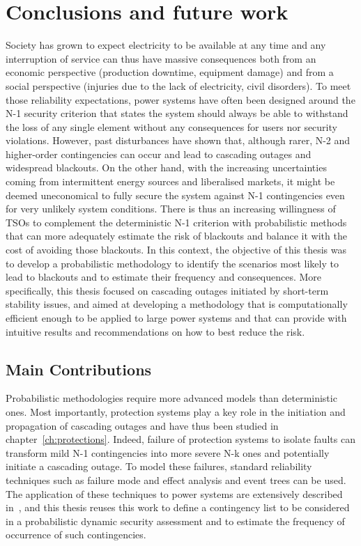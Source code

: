 
\chapter{Conclusions and future work}
\label{ch:perspectives}

Society has grown to expect electricity to be available at any time and any interruption of service can thus have massive consequences both from an economic perspective (production downtime, equipment damage) and from a social perspective (injuries due to the lack of electricity, civil disorders). To meet those reliability expectations, power systems have often been designed around the N-1 security criterion that states the system should always be able to withstand the loss of any single element without any consequences for users nor security violations. However, past disturbances have shown that, although rarer, N-2 and higher-order contingencies can occur and lead to cascading outages and widespread blackouts. On the other hand, with the increasing uncertainties coming from intermittent energy sources and liberalised markets, it might be deemed uneconomical to fully secure the system against N-1 contingencies even for very unlikely system conditions. There is thus an increasing willingness of TSOs to complement the deterministic N-1 criterion with probabilistic methods that can more adequately estimate the risk of blackouts and balance it with the cost of avoiding those blackouts. In this context, the objective of this thesis was to develop a probabilistic methodology to identify the scenarios most likely to lead to blackouts and to estimate their frequency and consequences. More specifically, this thesis focused on cascading outages initiated by short-term stability issues, and aimed at developing a methodology that is computationally efficient enough to be applied to large power systems and that can provide with intuitive results and recommendations on how to best reduce the risk.

\section{Main Contributions}

Probabilistic methodologies require more advanced models than deterministic ones. Most importantly, protection systems play a key role in the initiation and propagation of cascading outages and have thus been studied in chapter~\ref{ch:protections}. Indeed, failure of protection systems to isolate faults can transform mild N-1 contingencies into more severe N-k ones and potentially initiate a cascading outage. To model these failures, standard reliability techniques such as failure mode and effect analysis and event trees can be used. The application of these techniques to power systems are extensively described in~\cite{GridPSA}, and this thesis reuses this work to define a contingency list to be considered in a probabilistic dynamic security assessment and to estimate the frequency of occurrence of such contingencies.

